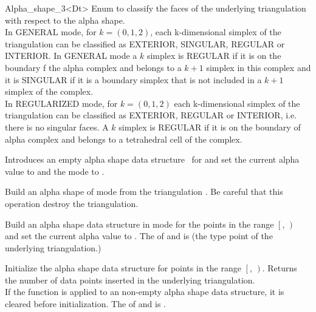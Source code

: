 \begin{ccRefClass} {Alpha_shape_3<Dt>}
{Enum to classify the faces of the underlying 
triangulation with respect to the alpha shape. \\ 
In GENERAL mode, for $k=(0,1,2)$,
 each k-dimensional simplex of the triangulation
can be classified as EXTERIOR, SINGULAR, REGULAR
or INTERIOR.
In GENERAL mode a $k$ simplex is REGULAR if it is on the boundary
f the alpha complex and belongs to a $k+1$ simplex in this complex
and it is SINGULAR  if it is  a boundary simplex that is not included in a $k+1$ simplex of the complex. \\  
In REGULARIZED mode, for $k=(0,1,2)$
each k-dimensional simplex of the triangulation
can be classified as EXTERIOR, REGULAR or INTERIOR, i.e.
there is no singular faces.
A $k$ simplex is REGULAR if it is on the boundary of alpha complex
and belongs to a tetrahedral cell of the complex.}




\ccCreation
{}

{Introduces an empty alpha shape data structure
\ccVar\ for and set the
current alpha value to  and the mode to .}

{Build an alpha shape of mode  
from the triangulation . 
Be careful that this operation destroy the triangulation.}

{Build an alpha shape data structure in mode  
for the points in the range
$\left[\right.$, $\left.\right)$ and 
set the current alpha value to .
\ccPrecond The  of  and
 is  (the type point of the underlying 
triangulation.)}


\ccModifiers

{Initialize the alpha shape data structure
for  points in the range
$\left[\right.$, $\left.\right)$. 
Returns the number of data points inserted in the underlying
triangulation. \\ 
If the function is applied to an non-empty alpha shape data structure, it is cleared
before initialization.
\ccPrecond The  of  and
 is .}


\end{ccRefClass}
